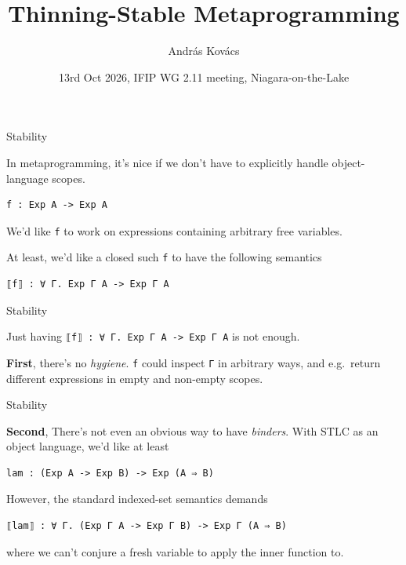 \documentclass[dvipsnames,aspectratio=169]{beamer}
\title{Thinning-Stable Metaprogramming}
\author{András Kovács}
\institute{University of Cambridge}
\date{13rd Oct 2026, IFIP WG 2.11 meeting, Niagara-on-the-Lake}
\newcommand{\vsp}{\vspace{1em}}
\newcommand{\vsph}{\vspace{0.5em}}
\theoremstyle{remark}
\begin{document}
\frame{\titlepage}

\begin{frame}[fragile]{Stability}

\vsp
In metaprogramming, it's nice if we don't have to explicitly handle
object-language scopes.
\vsp

\begin{Verbatim}[commandchars=\\\{\}]
  f : Exp A -> Exp A
\end{Verbatim}
\vsp
We'd like \texttt{f} to work on expressions containing arbitrary free variables.
\vsp

At least, we'd like a closed such \texttt{f} to have the following semantics
\vsp
\begin{Verbatim}[commandchars=\\\{\}]
  ⟦f⟧ : ∀ Γ. Exp Γ A -> Exp Γ A
\end{Verbatim}
\vsp

\end{frame}

\begin{frame}[fragile]{Stability}

Just having \texttt{⟦f⟧ : ∀ Γ. Exp Γ A -> Exp Γ A} is not enough.
\vsp


\textbf{First}, there's no \emph{hygiene}. \texttt{f} could inspect \texttt{Γ} in arbitrary ways,
and e.g.\ return different expressions in empty and non-empty scopes.

\end{frame}


\begin{frame}[fragile]{Stability}

\textbf{Second}, There's not even an obvious way to have \emph{binders}. With STLC as an object language,
we'd like at least
\vsph
\begin{Verbatim}[commandchars=\\\{\}]
  lam : (Exp A -> Exp B) -> Exp (A ⇒ B)
\end{Verbatim}
\vsph
However, the standard indexed-set semantics demands
\vsph
\begin{Verbatim}[commandchars=\\\{\}]
  ⟦lam⟧ : ∀ Γ. (Exp Γ A -> Exp Γ B) -> Exp Γ (A ⇒ B)
\end{Verbatim}
\vsph
where we can't conjure a fresh variable to apply the inner function to.

\end{frame}
\end{document}
